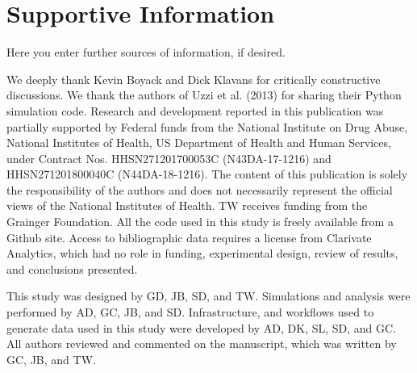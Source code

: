 \documentclass[NETN]{stjour}
\begin{document}
\section{Supportive Information}
Here you enter further sources of information, if desired.



\acknowledgments
We deeply thank Kevin Boyack and Dick Klavans for critically constructive discussions. We thank the authors of Uzzi et al. (2013) for sharing their Python simulation code. Research and development reported in this publication was partially supported by Federal funds from the National Institute on Drug Abuse, National Institutes of Health, US Department of Health and Human Services, under Contract Nos. HHSN271201700053C (N43DA-17-1216) and HHSN271201800040C (N44DA-18-1216). The content of this publication is solely the responsibility of the authors and does not necessarily represent the official views of the National Institutes of Health. TW receives funding from the Grainger Foundation. All the code used in this study is freely available from a Github site. Access to bibliographic data requires a license from Clarivate Analytics, which had no role in 
funding, experimental design, review of results, and conclusions presented. 

\authorcontributions 
This study was designed by GD, JB, SD, and TW. Simulations and analysis were performed by AD, GC, JB, and SD. Infrastructure, and workflows used to generate data used in this study were developed by AD, DK, SL, SD, and GC.  All authors reviewed and commented on the manuscript, which was written by GC, JB, and TW.

\newpage



\end{document}
